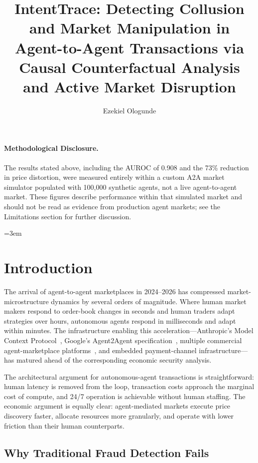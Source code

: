 \documentclass[sigconf,nonacm]{acmart}
\title{IntentTrace: Detecting Collusion and Market Manipulation in Agent-to-Agent Transactions via Causal Counterfactual Analysis and Active Market Disruption}
\author{Ezekiel Ologunde}
\affiliation{%
  \institution{Independent Researcher}
  \city{Boston}
  \state{MA}
  \country{USA}}
\begin{document}
\maketitle

\paragraph{Methodological Disclosure.} The results stated above, including the AUROC of 0.908 and the 73\% reduction in price distortion, were measured entirely within a custom A2A market simulator populated with 100,000 synthetic agents, not a live agent-to-agent market. These figures describe performance within that simulated market and should not be read as evidence from production agent markets; see the Limitations section for further discussion.

\sloppy
{}
\emergencystretch=3em
\hfuzz=10pt

\section{Introduction}

The arrival of agent-to-agent marketplaces in 2024--2026 has
compressed market-microstructure dynamics by several orders of
magnitude. Where human market makers respond to order-book changes
in seconds and human traders adapt strategies over hours, autonomous
agents respond in milliseconds and adapt within minutes. The
infrastructure enabling this acceleration---Anthropic's Model Context
Protocol~\cite{anthropic2024mcp}, Google's Agent2Agent
specification~\cite{google2024a2a}, multiple commercial agent-marketplace
platforms~\cite{aimarket2025survey}, and embedded payment-channel
infrastructure---has matured ahead of the corresponding economic
security analysis.

The architectural argument for autonomous-agent transactions is
straightforward: human latency is removed from the loop, transaction
costs approach the marginal cost of compute, and 24/7 operation is
achievable without human staffing. The economic argument is equally
clear: agent-mediated markets execute price discovery faster, allocate
resources more granularly, and operate with lower friction than their
human counterparts.

\subsection{Why Traditional Fraud Detection Fails}
\end{document}

